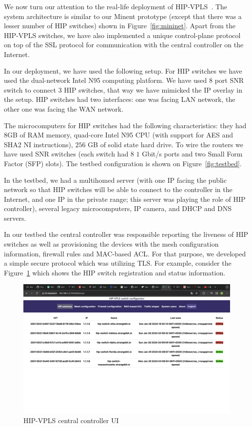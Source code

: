 We now turn our attention to the real-life deployment 
of HIP-VPLS~\cite{hipvpls-hw, hipvpls-controller}. The system architecture is similar to our Minent prototype
(except that there was a lesser number of HIP switches) shown in Figure~\ref{fig:mininet}. 
Apart from the HIP-VPLS switches, we have also implemented a unique 
control-plane protocol on top of the SSL protocol for communication 
with the central controller on the Internet.

In our deployment, we have used the following setup. For HIP switches we 
have used the dual-network Intel N95 computing platform. We have used $8$ 
port SNR switch to connect $3$ HIP switches, that way we have mimicked the 
IP overlay in the setup. HIP switches had two interfaces: one was facing 
LAN network, the other one was facing the WAN network. 

The microcomputers for HIP switches had the following characteristics: they had $8$GB of RAM memory, 
quad-core Intel N95 CPU (with support for AES and SHA2 NI instructions), $256$ GB of 
solid state hard drive. To wire the routers we have used SNR switches 
(each switch had $8$ $1$ Gbit/s ports and two Small Form Factor (SFP) slots). 
The testbed configuration is shown on Figure~\ref{fig:testbed}.

In the testbed, we had a multihomed server (with one IP facing 
the public network so that HIP switches will be able to connect to 
the controller in the Internet, and one IP in the private range; this server
was playing the role of HIP controller), several legacy microcomputers, 
IP camera, and DHCP and DNS servers.

In our testbed the central controller was responsible 
reporting the liveness of HIP switches as well as provisioning 
the devices with the mesh configuration information, firewall rules 
and MAC-based ACL. For that purpose, we developed a simple 
secure protocol which was utilizing TLS. For example, consider 
the Figure~\ref{devices} which shows the HIP switch registration
and status information.

\begin{figure}[h!]
    \centering
    \includegraphics[width=1\textwidth]{graphics/devices.png}
    \caption{HIP-VPLS central controller UI}
    \label{devices}
\end{figure}

